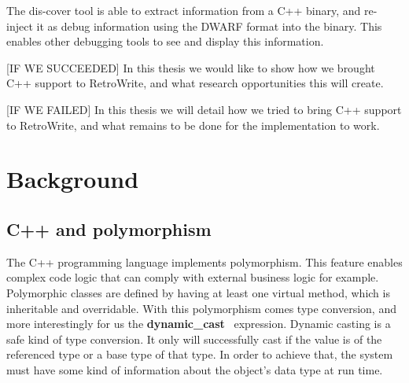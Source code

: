 \documentclass[a4paper,11pt,oneside]{report}
\begin{document}
The dis-cover tool is able to extract information from a C++ binary, and re-inject it as debug information using the DWARF format into the binary.
This enables other debugging tools to see and display this information.







[IF WE SUCCEEDED]
In this thesis we would like to show how we brought C++ support to RetroWrite, and what research opportunities this will create.

[IF WE FAILED]
In this thesis we will detail how we tried to bring C++ support to RetroWrite, and what remains to be done for the implementation to work.


\chapter{Background}



\section{C++ and polymorphism}

The C++ programming language implements polymorphism.
This feature enables complex code logic that can comply with external business logic for example.
Polymorphic classes are defined by having at least one virtual method, which is inheritable and overridable.
With this polymorphism comes type conversion, and more interestingly for us the \textbf{dynamic\_cast}~\cite{dynamiccast} expression.
Dynamic casting is a safe kind of type conversion.
It only will successfully cast if the value is of the referenced type or a base type of that type.
In order to achieve that, the system must have some kind of information about the object's data type at run time.
\end{document}
